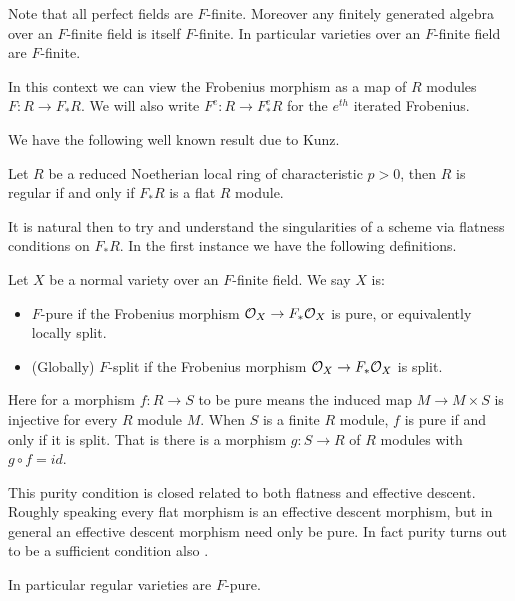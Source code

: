 Note that all perfect fields are $F$-finite. Moreover any finitely generated algebra over an $F$-finite field is itself $F$-finite. In particular varieties over an $F$-finite field are $F$-finite.

In this context we can view the Frobenius morphism as a map of $R$ modules $F\colon R \to F_{*}R$. We will also write $F^{e}:R \to F_{*}^{e}R$ for the $e^{th}$ iterated Frobenius.

We have the following well known result due to Kunz.

\begin{theorem}\cite[Tag 0EC0]{stacks-project}\cite{kunz1969characterizations}
	Let $R$ be a reduced Noetherian local ring of characteristic $p> 0$, then $R$ is regular if and only if $F_{*}R$ is a flat $R$ module.
\end{theorem}

It is natural then to try and understand the singularities of a scheme via flatness conditions on $F_{*}R$. In the first instance we have the following definitions.

\begin{definition}
	Let $X$ be a normal variety over an $F$-finite field.
	We say $X$ is:
	\begin{itemize}
		\item $F$-pure if the Frobenius morphism $\mathcal{O}_{X} \to F_{*}\mathcal{O}_{X}$ is pure, or equivalently locally split.
		\item (Globally) $F$-split if the Frobenius morphism $\mathcal{O}_{X} \to F_{*}\mathcal{O}_{X}$ is split.
	\end{itemize} 
\end{definition}

Here for a morphism $f\colon R \to S$ to be pure means the induced map $M \to M \times S$ is injective for every $R$ module $M$. When $S$ is a finite $R$ module, $f$ is pure if and only if it is split. That is there is a morphism $g\colon S \to R$ of $R$ modules with $g \circ f =id$.

\begin{remark}

	This purity condition is closed related to both flatness and effective descent. Roughly speaking every flat morphism is an effective descent morphism, but in general an effective descent morphism need only be pure. In fact purity turns out to be a sufficient condition also \cite[Tag 08WE]{stacks-project}.
	
	In particular regular varieties are $F$-pure.
	
	\end{remark}


